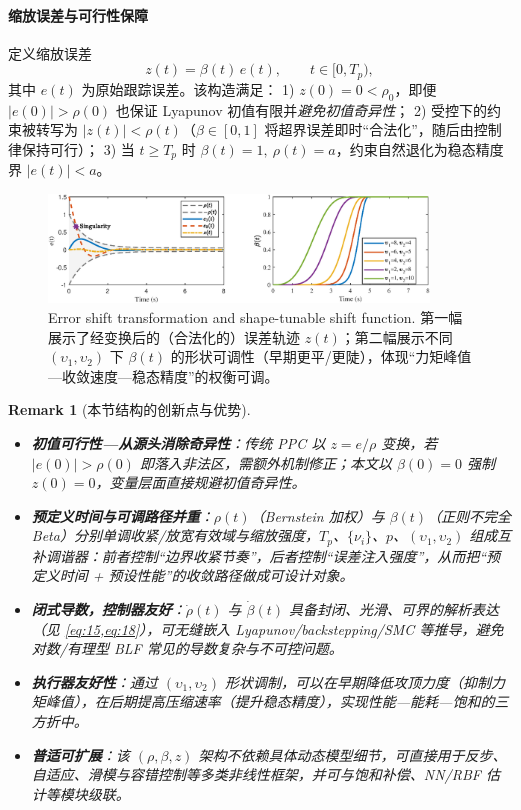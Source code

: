 \documentclass[pdflatex,sn-mathphys-num]{sn-jnl}%
\theoremstyle{thmstyleone}%
\theoremstyle{thmstyletwo}%
\newtheorem{remark}{Remark}%
\theoremstyle{thmstylethree}%
\begin{document}
	\paragraph{缩放误差与可行性保障}
	定义缩放误差
	\begin{equation}\label{eq:19}
	  z(t)=\beta(t)\,e(t), \qquad t\in[0,T_p),
	\end{equation}
	其中 $e(t)$ 为原始跟踪误差。该构造满足：  
	1) $z(0)=0<\rho_0$，即便 $|e(0)|>\rho(0)$ 也保证 Lyapunov 初值有限并\emph{避免初值奇异性}；  
	2) 受控下的约束被转写为 $|z(t)|<\rho(t)$（$\beta\!\in\![0,1]$ 将超界误差即时“合法化”，随后由控制律保持可行）；  
	3) 当 $t\ge T_p$ 时 $\beta(t)=1,\ \rho(t)=a$，约束自然退化为稳态精度界 $|e(t)|<a$。
	
	\begin{figure}[H]
	  \centering
	  \includegraphics[width=0.9\textwidth]{fig1.eps}
	  \caption{Error shift transformation and shape-tunable shift function. 第一幅展示了经变换后的（合法化的）误差轨迹 $z(t)$；第二幅展示不同 $(\upsilon_1,\upsilon_2)$ 下 $\beta(t)$ 的形状可调性（早期更平/更陡），体现“力矩峰值—收敛速度—稳态精度”的权衡可调。}
	  \label{fig:1}
	\end{figure}
	
	\begin{remark}[本节结构的创新点与优势]
	\leavevmode
	\begin{itemize}
	  \item \textbf{初值可行性—从源头消除奇异性}：传统 PPC 以 $z=e/\rho$ 变换，若 $|e(0)|>\rho(0)$ 即落入非法区，需额外机制修正；本文以 $\beta(0)=0$ 强制 $z(0)=0$，\emph{变量层面}直接规避初值奇异性。
	  \item \textbf{预定义时间与可调路径并重}：$\rho(t)$（Bernstein 加权）与 $\beta(t)$（正则不完全 Beta）分别单调收紧/放宽有效域与缩放强度，$T_p$、$\{\nu_i\}$、$p$、$(\upsilon_1,\upsilon_2)$ 组成\emph{互补调谐器}：前者控制“边界收紧节奏”，后者控制“误差注入强度”，从而把“预定义时间 + 预设性能”的\emph{收敛路径}做成\emph{可设计}对象。
	  \item \textbf{闭式导数，控制器友好}：$\dot\rho(t)$ 与 $\dot\beta(t)$ 具备\emph{封闭、光滑、可界}的解析表达（见 \cref{eq:15,eq:18}），可无缝嵌入 Lyapunov/backstepping/SMC 等推导，避免对数/有理型 BLF 常见的导数复杂与不可控问题。
	  \item \textbf{执行器友好性}：通过 $(\upsilon_1,\upsilon_2)$ 形状调制，可以在早期降低攻顶力度（抑制力矩峰值），在后期提高压缩速率（提升稳态精度），实现\emph{性能—能耗—饱和}的三方折中。
	  \item \textbf{普适可扩展}：该 $(\rho,\beta,z)$ 架构不依赖具体动态模型细节，可直接用于反步、自适应、滑模与容错控制等多类非线性框架，并可与饱和补偿、NN/RBF 估计等模块级联。
	\end{itemize}
	\end{remark}
\end{document}
